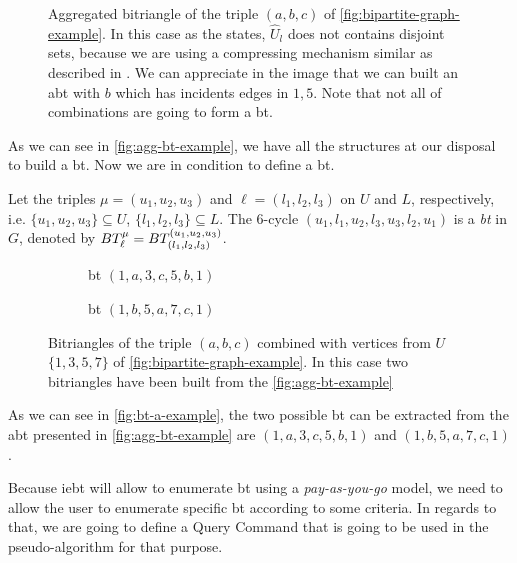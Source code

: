 \begin{figure}[h!]
\centering      
{}
\caption[{[\acrshort{iebt}] Example Aggregated bitriangle}]{Aggregated bitriangle of the triple $(a,b,c)$ of \autoref{fig:bipartite-graph-example}. In this case as the  states, $\hat{U}_l$ does not contains disjoint sets, because we are using a compressing mechanism similar as described in \cite{Lai}. We can appreciate in the image that we can built an \acrshort{abt} with $b$ which has incidents edges in $1,5$. Note that not all of combinations are going to form a \acrshort{bt}.}
\label{fig:agg-bt-example}
\end{figure}
      
As we can see in \autoref{fig:agg-bt-example}, we have all the structures at our disposal to build a \acrshort{bt}. Now we are in condition to define a \acrshort{bt}.

\begin{definition}[\acrlong{bt}]\label{def:bt}
Let the triples $\mu=(u_1, u_2, u_3)$ and $\ell=(l_1, l_2,l_3)$ on $U$ and $L$, respectively, i.e.  $\{u_1, u_2, u_3\} \subseteq U$, $\{l_1, l_2,l_3\} \subseteq L$. 
The 6-cycle $(u_1,l_1,u_2,l_3,u_3,l_2,u_1)$  is a \textit{\acrfull{bt}} in $G$, denoted by $BT_{\ell}^{\mu} = BT_{(l_1, l_2,l_3)}^{(u_1, u_2, u_3)}$. 
\end{definition}      

\begin{figure}[h!]
\begin{subfigure}[b]{0.5\textwidth}
\centering
{}
\caption{\acrshort{bt} $(1,a,3,c,5,b,1)$}
\end{subfigure}
\begin{subfigure}[b]{0.5\textwidth}
\centering
{}
\caption{\acrshort{bt} $(1,b,5,a,7,c,1)$}
\end{subfigure}
\caption[{[\acrshort{iebt}] Example of bitriangles}]{Bitriangles of the triple $(a,b,c)$ combined with vertices from $U$ $\{1,3,5,7\}$ of \autoref{fig:bipartite-graph-example}. In this case two bitriangles have been built from the \autoref{fig:agg-bt-example}}
\label{fig:bt-a-example}
\end{figure}

As we can see in \autoref{fig:bt-a-example}, the two possible \acrshort{bt} can be extracted from the \acrshort{abt} presented in \autoref{fig:agg-bt-example} are $(1,a,3,c,5,b,1)$ and $(1,b,5,a,7,c,1)$.

Because \acrshort{iebt} will allow to enumerate \acrshort{bt} using a \emph{pay-as-you-go} model, we need to allow the user to enumerate specific \acrshort{bt} according to some criteria.
In regards to that, we are going to define a Query Command that is going to be used in the pseudo-algorithm for that purpose.


